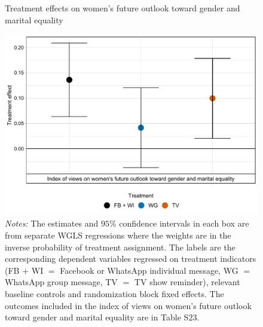 \documentclass[12pt]{article}
\begin{document}
\begin{figure}[H]
    \centering
    \caption{Treatment effects on women’s future outlook toward gender and marital equality}
    \includegraphics[width=12cm, height=9cm\textwidth]{Figures/RF-FS/Figure5.pdf}
        \captionsetup{width=.75\linewidth}
    \caption*{\footnotesize \textit{Notes:} The estimates and $95$\% confidence intervals in each box are from separate WGLS regressions where the weights are in the inverse probability of treatment assignment. The labels are the corresponding dependent variables regressed on treatment indicators (FB $+$ WI $=$ Facebook or WhatsApp individual message, WG $=$ WhatsApp group message, TV $=$ TV show reminder), relevant baseline controls and randomization block fixed effects. The outcomes included in the index of views on women's future outlook toward gender and marital equality are in Table S$23$.}
\end{figure}

\clearpage
 
\end{document}
